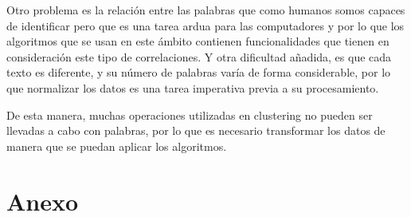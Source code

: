 \documentclass[10pt, a4paper]{article}
\begin{document}
Otro problema es la relación entre las palabras que como humanos somos capaces de identificar pero que es una tarea ardua para las computadores y por lo que los algoritmos que se usan en este ámbito contienen funcionalidades que tienen en consideración este tipo de correlaciones. Y otra dificultad añadida, es que cada texto es diferente, y su número de palabras varía de forma considerable, por lo que normalizar los datos es una tarea imperativa previa a su procesamiento. 

De esta manera, muchas operaciones utilizadas en clustering no pueden ser llevadas a cabo con palabras, por lo que es necesario transformar los datos de manera que se puedan aplicar los algoritmos. 

\begin{comment}
Preparar datos y forma de trabajar
  a survey of text mining techniques and applications
  pattern and cluster mining on text data
  technique of cluster validity for text mining
  survey
  textmining

Algoritmos
  improved som algorithm applied in text clustering
  survey on text clustering algorithm
  survey

COVID

\end{comment}   





 



\clearpage

\section{Anexo}

\renewcommand{\listalgorithmcfname}{\subsection{\textbf{Algoritmos}}}
\listofalgorithms

\renewcommand{\listtablename}{\subsection{\textbf{Tablas}}}
\listoftables
\end{document}

